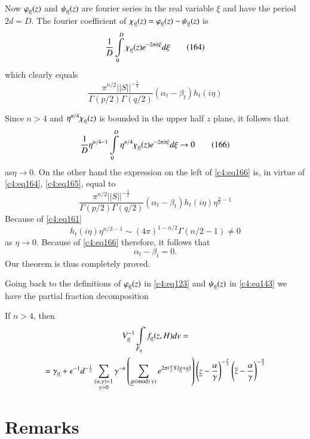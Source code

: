 Now $\varphi_{\underline{a}}(z)$ and $\psi_{\underline{a}}(z)$ are fourier series in
the real variable $\xi$ and have the period $2d=D$. The fourier
coefficient of $\chi_{\underline{a}}(z)=\varphi_{\underline{a}}(z)-\psi_{\underline{a}}(z)$
is
\begin{equation*}
\frac{1}{D}\int\limits^{D}_{0}\chi_{\underline{a}}(z)e^{-2\pi
  it\xi}d\xi\tag{164}\label{c4:eq164} 
\end{equation*}
which clearly equals
\begin{equation*}
\frac{\pi^{n/2}||S||^{-\frac{1}{2}}}{\Gamma(p/2)\Gamma(q/2)}(\alpha_{t}-\beta_{t})h_{t}(i\eta)\tag{165}\label{c4:eq165}
\end{equation*}

Since $n>4$ and $\eta^{n/4}\chi_{\underline{a}}(z)$ is bounded in the upper
half $z$ plane, it follows that
\begin{equation*}
\frac{1}{D}\eta^{n/4-1}\int\limits^{D}_{0}\eta^{n/4}\chi_{\underline{a}}(z)e^{-2\pi
  it\xi}d\xi\to 0\tag{166}\label{c4:eq166}
\end{equation*} 
as\pageoriginale $\eta\to 0$. On the other hand the expression on the
left of \eqref{c4:eq166} is, in virtue of \eqref{c4:eq164}, \eqref{c4:eq165}, equal
to
$$
\frac{\pi^{n/2}||S||^{-\frac{1}{2}}}{\Gamma(p/2)\Gamma(q/2)}(\alpha_{t}-\beta_{t})h_{t}(i\eta)\eta^{\frac{n}{2}-1} 
$$
Because of \eqref{c4:eq161}
$$
h_{t}(i\eta)\eta^{n/2-1}\sim (4\pi)^{1-n/2}\Gamma(n/2-1)\neq 0
$$
as $\eta\to 0$. Because of \eqref{c4:eq166} therefore, it follows that 
$$
\alpha_{t}-\beta_{t}=0.
$$
Our theorem is thus completely proved.

Going back to the definitions of $\varphi_{\underline{a}}(z)$ in \eqref{c4:eq123}
and $\psi_{\underline{a}}(z)$ in \eqref{c4:eq143} we have the partial fraction
decomposition 

\begin{thm}\label{chap4:thm12}
If $n>4$, then
\begin{gather*}
V^{-1}_{\underline{a}}\int\limits_{F_{\underline{a}}}f_{\underline{a}}(z,H)dv=\\
=\gamma_{\underline{a}}+\epsilon^{-1}d^{-\frac{1}{2}}\sum_{\substack{(\alpha,\gamma)=1\\ \gamma>0}}\gamma^{-n}\left(\sum_{\underline{g}(\rm(mod)
  \; \gamma)}e^{2\pi
  i\frac{\alpha}{\gamma}S[\underline{g}+\underline{a}]}\right)\left(\underline{z}-\frac{\alpha}{\gamma}\right)^{-\frac{p}{2}}\left(\overline{z}-\frac{\alpha}{\gamma}\right)^{-\frac{q}{2}} 
\end{gather*}
\end{thm}

\section{Remarks}\label{chap4:sec10}

